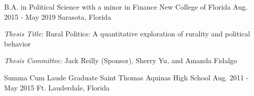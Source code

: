 

\begin{cventries}

  \cventry
    {B.A. in Political Science with a minor in Finance} %
    {New College of Florida} %
    {Aug. 2015 - May 2019} %
    {Sarasota, Florida} %
    {
    \begin{cvitems}
      \item \emph{Thesis Title:} Rural Politics: A quantitative exploration of rurality and political behavior
      \item \emph{Thesis Committee:} Jack Reilly (Sponsor), Sherry Yu, and Amanda Fidalgo
    \end{cvitems}
  }


  \cventry
    {Summa Cum Laude Graduate} %
    {Saint Thomas Aquinas High School} %
    {Aug. 2011 - May 2015} %
    {Ft. Lauderdale, Florida} %
    {}

\vspace{-.25cm}




\end{cventries}
